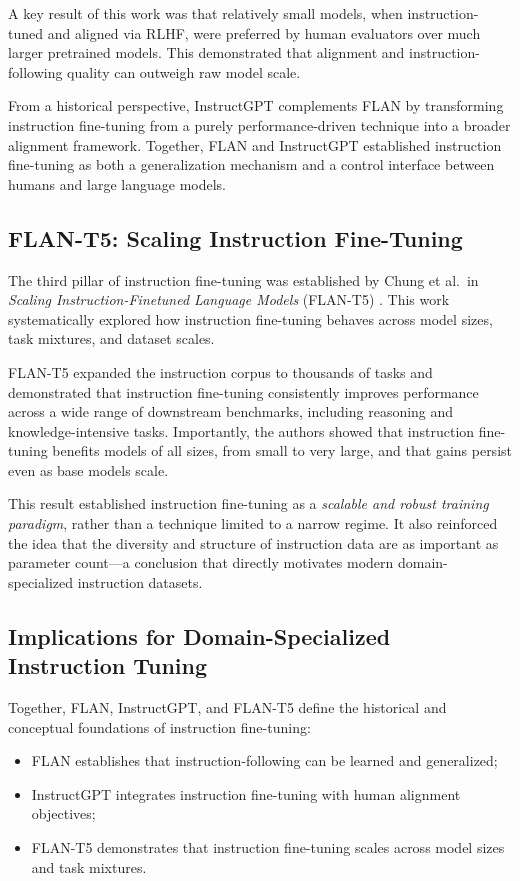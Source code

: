 \documentclass[unnumsec,webpdf,contemporary,large]{oup-authoring-template}
\theoremstyle{thmstyleone}
\theoremstyle{thmstyletwo}
\theoremstyle{thmstylethree}
\begin{document}
A key result of this work was that relatively small models, when instruction-tuned and aligned via RLHF, were preferred by human evaluators over much larger pretrained models. This demonstrated that alignment and instruction-following quality can outweigh raw model scale.

From a historical perspective, InstructGPT complements FLAN by transforming instruction fine-tuning from a purely performance-driven technique into a broader alignment framework. Together, FLAN and InstructGPT established instruction fine-tuning as both a generalization mechanism and a control interface between humans and large language models.

\subsection{FLAN-T5: Scaling Instruction Fine-Tuning}

The third pillar of instruction fine-tuning was established by Chung et al.\ in \emph{Scaling Instruction-Finetuned Language Models} (FLAN-T5) \cite{chung2022flant5}. This work systematically explored how instruction fine-tuning behaves across model sizes, task mixtures, and dataset scales.

FLAN-T5 expanded the instruction corpus to thousands of tasks and demonstrated that instruction fine-tuning consistently improves performance across a wide range of downstream benchmarks, including reasoning and knowledge-intensive tasks. Importantly, the authors showed that instruction fine-tuning benefits models of all sizes, from small to very large, and that gains persist even as base models scale.

This result established instruction fine-tuning as a \emph{scalable and robust training paradigm}, rather than a technique limited to a narrow regime. It also reinforced the idea that the diversity and structure of instruction data are as important as parameter count---a conclusion that directly motivates modern domain-specialized instruction datasets.

\subsection{Implications for Domain-Specialized Instruction Tuning}

Together, FLAN, InstructGPT, and FLAN-T5 define the historical and conceptual foundations of instruction fine-tuning:
\begin{itemize}
  \item FLAN establishes that instruction-following can be learned and generalized;
  \item InstructGPT integrates instruction fine-tuning with human alignment objectives;
  \item FLAN-T5 demonstrates that instruction fine-tuning scales across model sizes and task mixtures.
\end{itemize}
\end{document}
